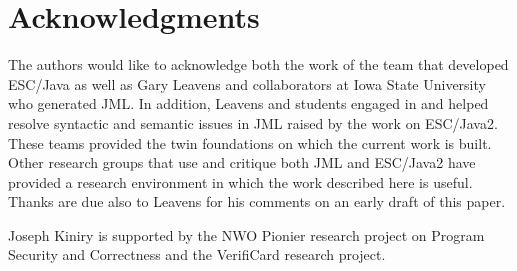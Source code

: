 \documentclass{llncs}
\begin{document}
\section{Acknowledgments}
The authors would like to acknowledge both the work of the team that
developed ESC/Java as well as Gary Leavens and collaborators at Iowa
State University who generated JML.  In addition, Leavens and students
engaged in and helped resolve syntactic and semantic issues in JML
raised by the work on ESC/Java2.  These teams provided the twin
foundations on which the current work is built.  Other research groups
that use and critique both JML and ESC/Java2 have provided a research
environment in which the work described here is useful.  Thanks are
due also to Leavens for his comments on an early draft of this paper.

Joseph Kiniry is supported by the NWO Pionier research project on
Program Security and Correctness and the VerifiCard research project.

%



%
%


\appendix
\end{document}
